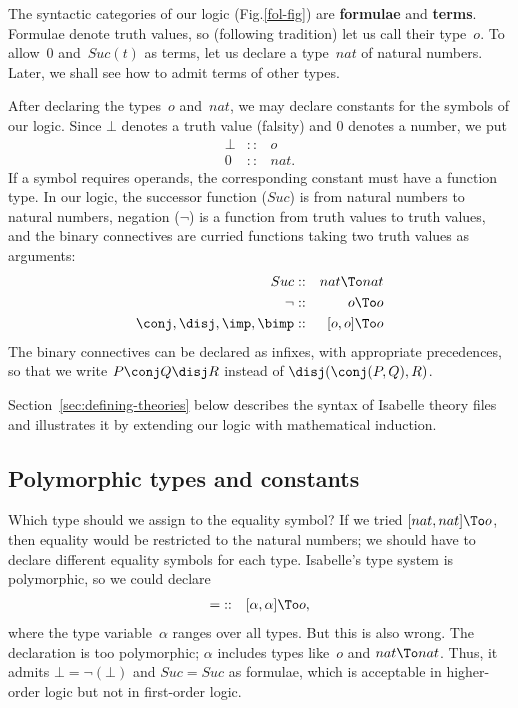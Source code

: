 The syntactic categories of our logic (Fig.\ts\ref{fol-fig}) are {\bf
  formulae} and {\bf terms}.  Formulae denote truth values, so (following
tradition) let us call their type~$o$.  To allow~0 and~$Suc(t)$ as terms,
let us declare a type~$nat$ of natural numbers.  Later, we shall see
how to admit terms of other types.

After declaring the types~$o$ and~$nat$, we may declare constants for the
symbols of our logic.  Since $\bot$ denotes a truth value (falsity) and 0
denotes a number, we put \begin{eqnarray*}
  \bot  & :: & o \\
  0     & :: & nat.
\end{eqnarray*}
If a symbol requires operands, the corresponding constant must have a
function type.  In our logic, the successor function
($Suc$) is from natural numbers to natural numbers, negation ($\neg$) is a
function from truth values to truth values, and the binary connectives are
curried functions taking two truth values as arguments: 
\begin{eqnarray*}
  Suc    & :: & nat\To nat  \\
  {\neg} & :: & o\To o      \\
  \conj,\disj,\imp,\bimp  & :: & [o,o]\To o 
\end{eqnarray*}
The binary connectives can be declared as infixes, with appropriate
precedences, so that we write $P\conj Q\disj R$ instead of
$\disj(\conj(P,Q), R)$.

Section~\ref{sec:defining-theories} below describes the syntax of Isabelle
theory files and illustrates it by extending our logic with mathematical
induction.


\subsection{Polymorphic types and constants} \label{polymorphic}

Which type should we assign to the equality symbol?  If we tried
$[nat,nat]\To o$, then equality would be restricted to the natural
numbers; we should have to declare different equality symbols for each
type.  Isabelle's type system is polymorphic, so we could declare
\begin{eqnarray*}
  {=}  & :: & [\alpha,\alpha]\To o,
\end{eqnarray*}
where the type variable~$\alpha$ ranges over all types.
But this is also wrong.  The declaration is too polymorphic; $\alpha$
includes types like~$o$ and $nat\To nat$.  Thus, it admits
$\bot=\neg(\bot)$ and $Suc=Suc$ as formulae, which is acceptable in
higher-order logic but not in first-order logic.

